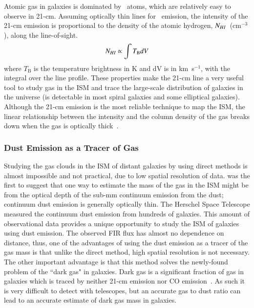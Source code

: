  
Atomic gas in galaxies is dominated by \hi~atoms, which are relatively easy to observe in 21-cm.
Assuming optically thin lines for \hi~emission, the intensity of the 21-cm emission is proportional to the density of the atomic hydrogen, $N_{H {\sc I}}$~(cm$^{-3}$), along the line-of-sight.
\begin{equation}
N_{H {\sc I}}  \propto \int T_{\mathrm B} dV
\end{equation}
where $T_{\mathrm B}$ is the temperature brightness in K and dV is in km~s$^{-1}$, with the integral over the line profile. 
These properties make the 21-cm line a very useful tool to study gas in the ISM and trace the large-scale distribution of galaxies in the universe (\hi is detectable in most spiral galaxies and some elliptical galaxies).
Although the 21-cm emission is the most reliable technique to map the ISM, the linear relationship between the intensity and the column density of the gas breaks down when the gas is optically thick~\citep{Braun09}. 

\subsubsection{Dust Emission as a Tracer of Gas} 

Studying the gas clouds in the ISM of distant galaxies by using direct methods is almost impossible and not practical, due to low spatial resolution of data.
\cite{Hildebran83} was the first to suggest that one way to estimate the mass of the gas in the ISM might be from the optical depth of the sub-mm continuum emission from the dust; continuum dust emission is generally optically thin. 
The Herschel Space Telescope \cite{Pilbratt10} measured the continuum dust emission from hundreds of galaxies\citep{Eales10, Oliver12}. 
This amount of observational data provides a unique opportunity to study the ISM of galaxies using dust emission. 
The observed FIR flux has almost no dependence on distance, thus, one of the advantages of using the dust emission as a tracer of the gas mass is that unlike the direct method, high spatial resolution is not necessary. 
The other important advantage is that this method solves the newly-found problem of the ``dark gas" in galaxies. 
Dark gas is a significant fraction of gas in galaxies which is traced by neither 21-cm emission nor CO emission~\citep{Abdo10}. 
As such it is very difficult to detect with telescopes, but an accurate gas to dust ratio can lead to an accurate estimate of dark gas mass in galaxies. 

